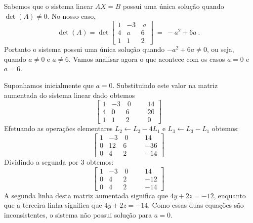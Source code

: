 \begin{solution} Sabemos que o sistema linear $AX=B$ possui uma única solução quando $\det(A) \neq 0$. No nosso caso,
$$ \det(A) = \det\left[\begin{array}{rrr}
  1 & -3 &  \ a  \\
  4 &  a &    6  \\ 
  1 &  1 &    2  \end{array}\right]\ =\ -a^2+6a\ . $$
Portanto o sistema possui uma única solução quando $-a^2+6a \neq 0$, ou seja, quando $a\neq 0$ e $a\neq 6$.
Vamos analisar agora o que acontece com os casos $a=0$ e $a=6$.

\medskip
Suponhamos inicialmente que $a=0$. Substituindo este valor na matriz aumentada do sistema linear dado obtemos
$$ \left[\begin{array}{rrrr|rr}
  1 & -3 &  \ 0 & & &  14  \\
  4 &  0 &    6 & & &  20  \\ 
  1 &  1 &    2 & & &   0  \end{array}\right] $$
Efetuando as operações elementares $L_2 \leftarrow L_2 - 4L_1$ e $L_3 \leftarrow L_3 - L_1$ obtemos:
$$ \left[\begin{array}{rrrr|rr}
  1 & -3 & \ 0 & & &   14  \\
  0 & 12 &   6 & & &  -36  \\ 
  0 &  4 &   2 & & &  -14 \end{array}\right] $$
Dividindo a segunda por $3$ obtemos:
$$ \left[\begin{array}{rrrr|rr}
  1 & -3 & \ 0 & & &   14  \\
  0 &  4 &   2 & & &  -12  \\ 
  0 &  4 &   2 & & &  -14 \end{array}\right] $$
A segunda linha desta matriz aumentada significa que $4y+2z=-12$, enquanto que a terceira linha significa que $4y+2z=-14$.
Como essas duas equações são inconsistentes, o sistema não possui solução para $a=0$.


\end{solution}
